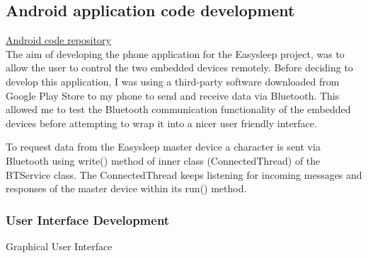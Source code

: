 \documentclass[12pt,a4paper]{article}
\begin{document}
    \subsection{Android application code development}
    \href{https://github.com/zedd-1983/Easysleep_app/tree/bt_connection_3}{Android code repository}\\
    
    The aim of developing the phone application for the Easysleep project, was to allow the user to control the two embedded devices remotely. Before deciding to develop this application, I was using a third-party software downloaded from Google Play Store to my phone to send and receive data via Bluetooth. This allowed me to test the Bluetooth communication functionality of the embedded devices before attempting to wrap it into a nicer user friendly interface.
    
    To request data from the Easysleep master device a character is sent via Bluetooth using write() method of inner class (ConnectedThread) of the BTService class. The ConnectedThread keeps listening for incoming messages and responses of the master device within its run() method. 
                
    \subsubsection{User Interface Development}
    Graphical User Interface\\
    
\end{document}

